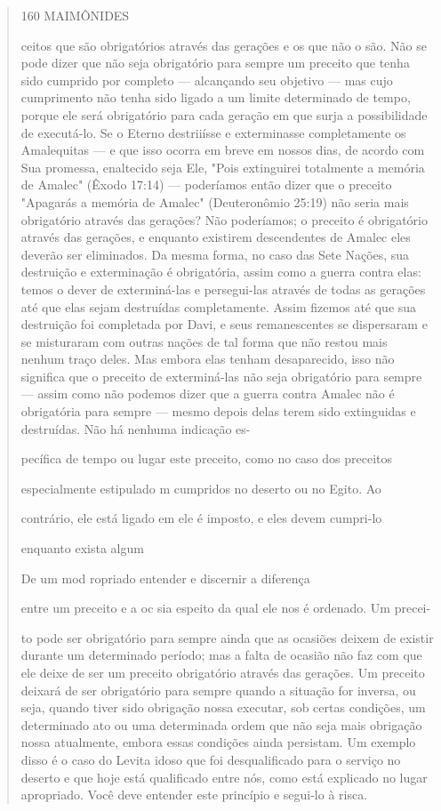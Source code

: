 \begin{quote}
160 MAIMÔNIDES

ceitos que são obrigatórios através das gerações e os que não o são. Não
se po­de dizer que não seja obrigatório para sempre um preceito que
tenha sido cum­prido por completo --- alcançando seu objetivo --- mas
cujo cumprimento não tenha sido ligado a um limite determinado de tempo,
porque ele será obrigató­rio para cada geração em que surja a
possibilidade de executá-lo. Se o Eterno destriiísse e exterminasse
completamente os Amalequitas --- e que isso ocorra em breve em nossos
dias, de acordo com Sua promessa, enaltecido seja Ele, "Pois extinguirei
totalmente a memória de Amalec" (Êxodo 17:14) --- podería­mos então
dizer que o preceito "Apagarás a memória de Amalec" (Deuteronô­mio
25:19) não seria mais obrigatório através das gerações? Não poderíamos;
o preceito é obrigatório através das gerações, e enquanto existirem
descenden­tes de Amalec eles deverão ser eliminados. Da mesma forma, no
caso das Sete Nações, sua destruição e exterminação é obrigatória, assim
como a guerra con­tra elas: temos o dever de exterminá-las e
persegui-las através de todas as gera­ções até que elas sejam destruídas
completamente. Assim fizemos até que sua destruição foi completada por
Davi, e seus remanescentes se dispersaram e se misturaram com outras
nações de tal forma que não restou mais nenhum traço deles. Mas embora
elas tenham desaparecido, isso não significa que o preceito de
exterminá-las não seja obrigatório para sempre --- assim como não
podemos dizer que a guerra contra Amalec não é obrigatória para sempre
--- mesmo de­pois delas terem sido extinguidas e destruídas. Não há
nenhuma indicação es-

pecífica de tempo ou lugar este preceito, como no caso dos preceitos

especialmente estipulado m cumpridos no deserto ou no Egito. Ao

contrário, ele está ligado em ele é imposto, e eles devem cumpri-lo

enquanto exista algum

De um mod ropriado entender e discernir a diferença

entre um preceito e a oc sia espeito da qual ele nos é ordenado. Um
precei-

to pode ser obrigatório para sempre ainda que as ocasiões deixem de
existir durante um determinado período; mas a falta de ocasião não faz
com que ele deixe de ser um preceito obrigatório através das gerações.
Um preceito deixará de ser obrigatório para sempre quando a situação for
inversa, ou seja, quando tiver sido obrigação nossa executar, sob certas
condições, um determinado ato ou uma determinada ordem que não seja mais
obrigação nossa atualmente, em­bora essas condições ainda persistam. Um
exemplo disso é o caso do Levita idoso que foi desqualificado para o
serviço no deserto e que hoje está qualifica­do entre nós, como está
explicado no lugar apropriado. Você deve entender este princípio e
segui-lo à risca.


\end{quote}
